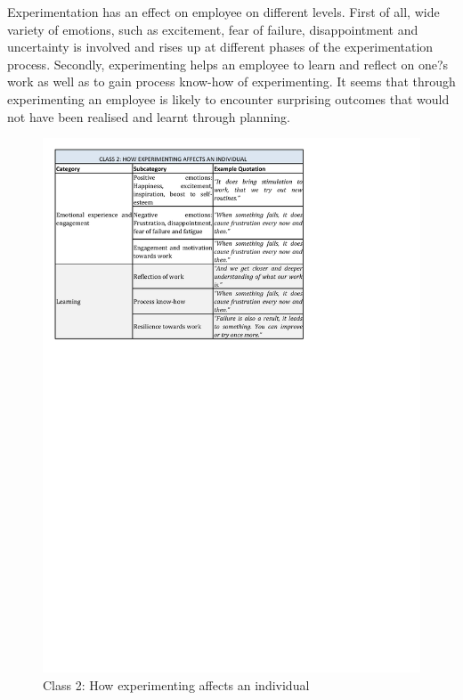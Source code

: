 Experimentation has an effect on employee on different levels. First of all, wide variety of emotions, such as excitement, fear of failure, disappointment and uncertainty is involved and rises up at different phases of the experimentation process. Secondly, experimenting helps an employee to learn and reflect on one?s work as well as to gain process know-how of experimenting. It seems that through experimenting an employee is likely to encounter surprising outcomes that would not have been realised and learnt through planning.  

\begin{figure}[!H]
\vspace{-30pt}
\hspace{-35pt}
\includegraphics{class2.pdf}
\caption{Class 2: How experimenting affects an individual}
\label{tbl:class2}
\end{figure}

